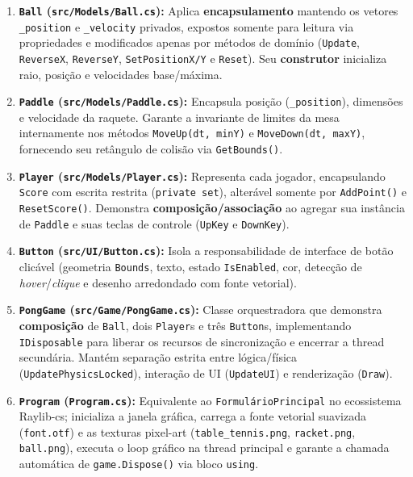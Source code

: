 \documentclass[10pt,a4paper]{article}
\begin{document}
\begin{enumerate}
    \item \textbf{\texttt{Ball} (\texttt{src/Models/Ball.cs}):} Aplica \textbf{encapsulamento} mantendo os vetores \texttt{\_position} e \texttt{\_velocity} privados, expostos somente para leitura via propriedades e modificados apenas por métodos de domínio (\texttt{Update}, \texttt{ReverseX}, \texttt{ReverseY}, \texttt{SetPositionX/Y} e \texttt{Reset}). Seu \textbf{construtor} inicializa raio, posição e velocidades base/máxima.
    \item \textbf{\texttt{Paddle} (\texttt{src/Models/Paddle.cs}):} Encapsula posição (\texttt{\_position}), dimensões e velocidade da raquete. Garante a invariante de limites da mesa internamente nos métodos \texttt{MoveUp(dt, minY)} e \texttt{MoveDown(dt, maxY)}, fornecendo seu retângulo de colisão via \texttt{GetBounds()}.
    \item \textbf{\texttt{Player} (\texttt{src/Models/Player.cs}):} Representa cada jogador, encapsulando \texttt{Score} com escrita restrita (\texttt{private set}), alterável somente por \texttt{AddPoint()} e \texttt{ResetScore()}. Demonstra \textbf{composição/associação} ao agregar sua instância de \texttt{Paddle} e suas teclas de controle (\texttt{UpKey} e \texttt{DownKey}).
    \item \textbf{\texttt{Button} (\texttt{src/UI/Button.cs}):} Isola a responsabilidade de interface de botão clicável (geometria \texttt{Bounds}, texto, estado \texttt{IsEnabled}, cor, detecção de \textit{hover}/\textit{clique} e desenho arredondado com fonte vetorial).
    \item \textbf{\texttt{PongGame} (\texttt{src/Game/PongGame.cs}):} Classe orquestradora que demonstra \textbf{composição} de \texttt{Ball}, dois \texttt{Player}s e três \texttt{Button}s, implementando \texttt{IDisposable} para liberar os recursos de sincronização e encerrar a thread secundária. Mantém separação estrita entre lógica/física (\texttt{UpdatePhysicsLocked}), interação de UI (\texttt{UpdateUI}) e renderização (\texttt{Draw}).
    \item \textbf{\texttt{Program} (\texttt{Program.cs}):} Equivalente ao \texttt{FormulárioPrincipal} no ecossistema Raylib-cs; inicializa a janela gráfica, carrega a fonte vetorial suavizada (\texttt{font.otf}) e as texturas pixel-art (\texttt{table\_tennis.png}, \texttt{racket.png}, \texttt{ball.png}), executa o loop gráfico na thread principal e garante a chamada automática de \texttt{game.Dispose()} via bloco \texttt{using}.
\end{enumerate}
\end{document}
